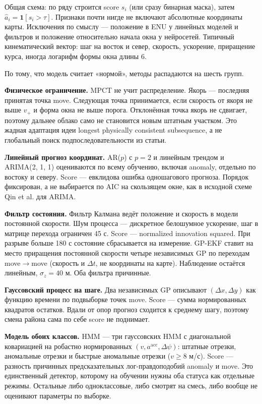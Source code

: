 \documentclass[a4paper,12pt]{report}
\begin{document}
Общая схема: по ряду строится score $s_i$ (или сразу бинарная маска), затем $\hat a_i=\mathbf{1}[s_i>\tau]$. Признаки почти нигде не включают абсолютные координаты карты. Исключения по смыслу — положение в ENU у линейных моделей и фильтров и положение относительно начала окна у нейросетей. Типичный кинематический вектор: шаг на восток и север, скорость, ускорение, приращение курса, иногда логарифм формы окна длины 6.

По тому, что модель считает «нормой», методы распадаются на шесть групп.

\textbf{Физическое ограничение.} MPCT не учит распределение. Якорь — последняя принятая точка move. Следующая точка принимается, если скорость от якоря не выше $v_+$ и форма окна не выше порога. Отклонённая точка якорь не сдвигает, поэтому дальнее облако само не становится новым штатным участком. Это жадная адаптация идеи longest physically consistent subsequence, а не глобальный поиск подпоследовательности из статьи.

\textbf{Линейный прогноз координат.} AR($p$) с $p=2$ и линейным трендом и ARIMA(2, 1, 1) оцениваются по всему обучению, включая anomaly, отдельно по востоку и северу. Score — евклидова ошибка одношагового прогноза. Порядок фиксирован, а не выбирается по AIC на скользящем окне, как в исходной схеме Qin et al. для ARIMA.

\textbf{Фильтр состояния.} Фильтр Калмана ведёт положение и скорость в модели постоянной скорости. Шум процесса — дискретное белошумное ускорение, шаг в матрице перехода ограничен 45 с. Score — normalized innovation squared. При разрыве больше 180 с состояние сбрасывается на измерение. GP-EKF ставит на место приращения постоянной скорости четыре независимых GP по переходам move$\to$move (скорость и $\Delta t$, не координаты на карте). Наблюдение остаётся линейным, $\sigma_z=40$ м. Оба фильтра причинные.

\textbf{Гауссовский процесс на шаге.} Два независимых GP описывают $(\Delta x,\Delta y)$ как функцию времени по подвыборке точек move. Score — сумма нормированных квадратов остатков. Вдали от опор прогноз сходится к среднему шагу, поэтому смена района сама по себе score не поднимает.

\textbf{Модель обоих классов.} HMM — три гауссовских HMM с диагональной ковариацией на робастно нормированных $(v, a^{\mathrm{acc}}, \Delta\psi)$: штатные отрезки, аномальные отрезки и быстрые аномальные отрезки ($v\ge 8$ м/с). Score — разность причинных предсказательных лог-правдоподобий anomaly и move. Это единственный детектор, которому на обучении нужны оба статуса как отдельные режимы. Остальные либо одноклассовые, либо смотрят на смесь, либо вообще не оценивают параметры по выборке.
\end{document}
